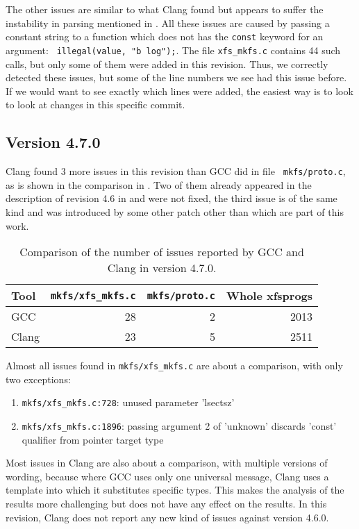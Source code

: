 The other issues are similar to what Clang found but appears to suffer the
instability in parsing mentioned in .
All these issues are caused by passing a constant string to a
function which does not has the {\tt const} keyword for an argument: {\tt
illegal(value, "b log");}. The file {\tt xfs\_mkfs.c} contains 44 such
calls, but only some of them were added in this revision. Thus, we correctly
detected these issues, but some of the line numbers we see had this issue
before. If we would want to see exactly which lines were added, the easiest way
is to look to look at changes in this specific commit.


\subsection{Version 4.7.0}\label{chap:results:gcc:4.7}

Clang found 3 more issues in this revision than GCC did in file {\tt
mkfs/proto.c}, as is shown in the comparison in . Two
of them already appeared in the description of revision 4.6 in
 and were not fixed, the third issue is of the same
kind and was introduced by some other patch other than which are part of this
work.

\begin{table}[h]
\begin{tabular}{|l||r|r||r|}
\hline
Tool & {\tt mkfs/xfs\_mkfs.c} & {\tt mkfs/proto.c} & Whole xfsprogs \\
\hline
GCC & 28 & 2 & 2013 \\
\hline
Clang & 23 & 5 & 2511 \\
\hline
\end{tabular}
\caption{Comparison of the number of issues reported by GCC and Clang in version
4.7.0.}
\label{tab:results:gcc:4.7}
\end{table}

Almost all issues found in {\tt mkfs/xfs\_mkfs.c} are about a comparison, with
only two exceptions:
\begin{enumerate}
	\item {\tt mkfs/xfs\_mkfs.c:728}: unused parameter 'lsectsz'
	\item {\tt mkfs/xfs\_mkfs.c:1896}: passing argument 2 of 'unknown'
		discards 'const' qualifier from pointer target type
\end{enumerate}


Most issues in Clang are also about a comparison, with multiple versions of
wording, because where GCC uses only one universal message, Clang uses a
template into which it substitutes specific types. This makes the analysis of
the results more challenging but does not have any effect on the results.
In this revision, Clang does not report any new kind of issues against version
4.6.0.

